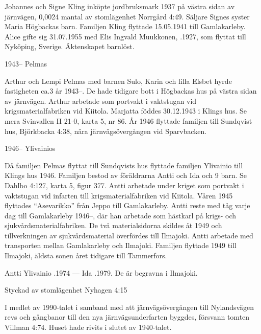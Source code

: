 Johannes och Signe Kling inköpte jordbruksmark 1937 på västra sidan av	järnvägen, 0,0024 mantal av stomlägenhet Norrgård 4:49. Säljare Signes syster Maria Högbackas barn.	Familjen Kling flyttade 15.05.1941 till Gamlakarleby. Alice gifte sig 31.07.1955 med Elis Ingvald Muukkonen, .1927, som flyttat till Nyköping, Sverige. Äktenskapet barnlöst.


1943--	Pelmas

Arthur och Lempi Pelmas med barnen Sulo, Karin och lilla Elsbet hyrde fastigheten ca.3 år 1943--. De hade tidigare bott i Högbackas hus på västra sidan av järnvägen. Arthur arbetade som portvakt i vaktstugan vid 	krigsmaterialfabriken vid Kiitola. Marjatta föddes 30.12.1943 i Klings hus. Se mera Svinvallen II 21-0, karta 5, nr 86. År 1946 flyttade familjen till Sundqvist hus, Björkbacka 4:38, nära järnvägsövergången vid Sparvbacken.

1946--	Ylivainios

Då familjen Pelmas flyttat till Sundqvists hus flyttade familjen Ylivainio till Klings hus 1946. Familjen bestod av föräldrarna Antti och Ida och 9 barn. Se Dahlbo 4:127, karta 5, figur 377. Antti arbetade under kriget som portvakt i vaktstugan vid infarten till krigsmaterialfabriken vid Kiitola. Våren 1945 flyttades ``Asevarikko'' från Jeppo till Gamlakarleby. Antti reste med tåg varje dag till Gamlakarleby 1946--, där han arbetade som hästkarl på krigs- och sjukvårdsmaterialfabriken. De två materialsidorna skildes åt 1949 och tillverkningen av sjukvårdsmaterial överfördes till Ilmajoki. Antti arbetade med transporten mellan Gamlakarleby och Ilmajoki. Familjen flyttade 1949 till Ilmajoki, äldsta sonen året tidigare till Tammerfors.

Antti Ylivainio .1974  ---  Ida .1979. De är begravna i Ilmajoki.



%

Styckad av stomlägenhet Nyhagen 4:15

%
I medlet av 1990-talet i samband med att järnvägsövergången till Nylandsvägen revs och gångbanor till den nya järnvägsunderfarten	byggdes, försvann tomten Villman 4:74. Huset hade rivits i slutet av 1940-talet.


